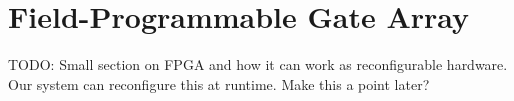 \section{Field-Programmable Gate Array}
TODO: Small section on FPGA and how it can work as reconfigurable hardware. Our
system can reconfigure this at runtime. Make this a point later?
